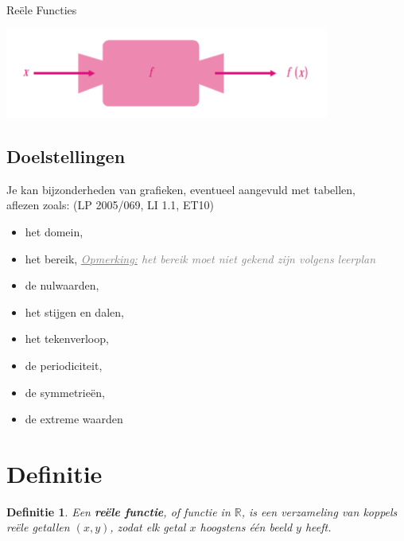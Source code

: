 \documentclass[12pt,twoside]{article}
\newcommand{\teacher}[1]{\textcolor{gray}{\emph{\underline{Opmerking:} #1}}}
\newcommand{\teacher}[1]{}
\newtheorem{definition}{Definitie}
\begin{document}
\thispagestyle{empty}
\begin{center}
  \begin{mdframed}
  \centering
  \fontsize{35}{70}\selectfont Reële Functies
  \end{mdframed}
  \vfill
  \includegraphics[width=0.8\textwidth]{FunctieMachine}
  \vfill
\end{center}
\vspace*{-2cm}
\subsection*{Doelstellingen}
{\singlespacing

Je kan bijzonderheden van grafieken,
eventueel aangevuld met tabellen,\\ aflezen zoals: \hfill  {\scriptsize(LP 2005/069, LI 1.1, ET10)}
\begin{itemize}
  \item het domein,
  \item het bereik, \teacher{het bereik moet niet gekend zijn volgens leerplan}
  \item de nulwaarden,
  \item het stijgen en dalen,
  \item het tekenverloop,
  \item de periodiciteit,
  \item de symmetrieën,
  \item de extreme waarden
\end{itemize}
}

\fancyhead[RE,LO]{}

\onehalfspacing

\pagebreak
\section{Definitie}

\begin{definition}
Een {\bf reële functie}, of functie in $\mathbb{R}$, is een verzameling van {\em koppels} reële getallen $(x,y)$, zodat elk getal $x$ {\em hoogstens één beeld} $y$ heeft.
\end{definition}
\end{document}
